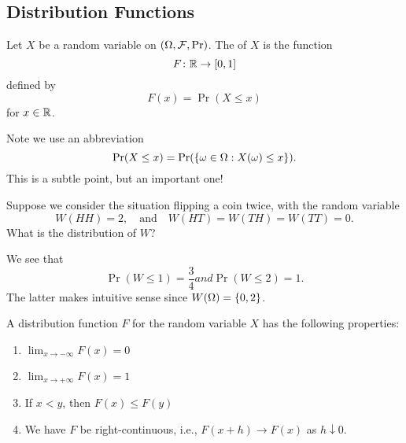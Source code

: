 \subsection{Distribution Functions}
Let $X$ be a random variable on $(\Omega,\mathcal{F},\mathop{\mathrm{Pr}}\nolimits)$. The
 of $X$ is the function
\begin{equation}
F\colon\mathbb{R}\to[0,1]
\end{equation}
defined by
\begin{equation}
F(x)=\Pr(X\leq x)
\end{equation}
for $x\in\mathbb{R}$.

Note we use an abbreviation
\begin{equation}
\mathop{\mathrm{Pr}}\nolimits(X\leq x)=\mathop{\mathrm{Pr}}\nolimits(\{\omega\in\Omega : X(\omega)\leq x\}).
\end{equation}
This is a subtle point, but an important one!

Suppose we consider the situation flipping a coin twice, with the random
variable
\begin{equation}
W(HH)=2,\quad\mbox{and}\quad W(HT)=W(TH)=W(TT)=0.
\end{equation}
What is the distribution of $W$?

We see that
\begin{subequations}
\begin{equation}
\Pr(W\leq 1)=\frac{3}{4}
\end{equation}
and
\begin{equation}
\Pr(W\leq2)=1.
\end{equation}
\end{subequations}
The latter makes intuitive sense since $W(\Omega)=\{0,2\}$. 

A distribution function $F$ for the random variable $X$ has the
following properties: 
\begin{enumerate}
\item $\displaystyle\lim_{x\to-\infty}F(x)=0$
\item $\displaystyle\lim_{x\to+\infty}F(x)=1$
\item If $x<y$, then $F(x)\leq F(y)$
\item We have $F$ be right-continuous, i.e., $F(x+h)\to F(x)$ as
  $h\downarrow 0$.
\end{enumerate}

